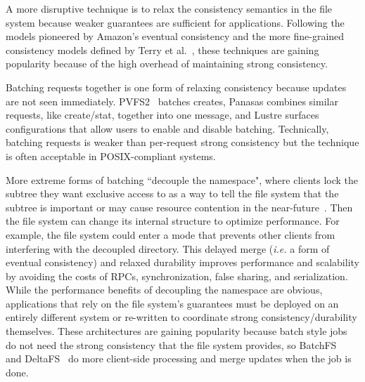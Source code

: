 A more disruptive technique is to relax the consistency semantics in the file
system because weaker guarantees are sufficient for applications. Following the
models pioneered by Amazon's eventual consistency and the more fine-grained
consistency models defined by Terry et al.~\cite{baseball}, these techniques
are gaining popularity because of the high overhead of maintaining strong
consistency.

Batching requests together is one form of relaxing consistency because updates
are not seen immediately. PVFS2~\cite{PVFS2} batches creates, Panasas combines
similar requests, like create/stat, together into one message, and Lustre
surfaces configurations that allow users to enable and disable batching.
Technically, batching requests is weaker than per-request strong consistency
but the technique is often acceptable in POSIX-compliant systems.

More extreme forms of batching ``decouple the namespace", where clients lock
the subtree they want exclusive access to as a way to tell the file system that
the subtree is important or may cause resource contention in the
near-future~\cite{grider:pdsw2015-marfs, zheng:pdsw2015-deltafs,
zheng:pdsw2014-batchfs, ren:sc2014-indexfs, bent:slides-twotiers}. Then the
file system can change its internal structure to optimize performance. For
example, the file system could enter a mode that prevents other clients from
interfering with the decoupled directory.  This delayed merge ({\it i.e.} a
form of eventual consistency) and relaxed durability improves performance and
scalability by avoiding the costs of RPCs, synchronization, false sharing, and
serialization.  While the performance benefits of decoupling the namespace are
obvious, applications that rely on the file system's guarantees must be
deployed on an entirely different system or re-written to coordinate strong
consistency/durability themselves.  These architectures are gaining popularity
because batch style jobs do not need the strong consistency that the file
system provides, so BatchFS~\cite{zheng:pdsw2014-batchfs} and
DeltaFS~\cite{zheng:pdsw2015-deltafs} do more client-side processing and merge
updates when the job is done.  

